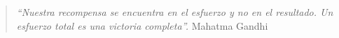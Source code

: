 \section*{}
	\begin{quote}
		{\it ``Nuestra recompensa se encuentra en el esfuerzo y no en el resultado. Un esfuerzo total es una victoria completa''.} Mahatma Gandhi
	\end{quote}